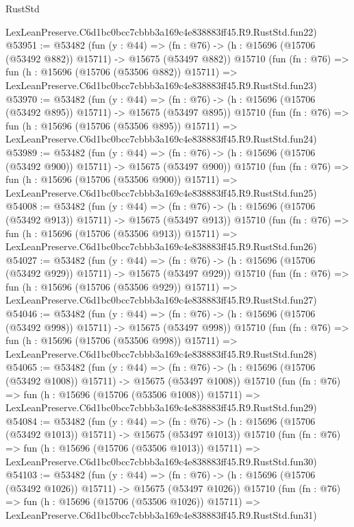 \begin{lexlean}{RustStd}
\begin{coremodule}
    LexLeanPreserve.C6d1bc0bcc7cbbb3a169c4e838883ff45.R9.RustStd.fun22)
@53951 := @53482
    (fun (y : @44) =>
    (fn : @76) -> (h : @15696 (@15706 (@53492 @882)) @15711) -> @15675 (@53497 @882))
    @15710
    (fun (fn : @76) =>
    fun (h : @15696 (@15706 (@53506 @882)) @15711) =>
    LexLeanPreserve.C6d1bc0bcc7cbbb3a169c4e838883ff45.R9.RustStd.fun23)
@53970 := @53482
    (fun (y : @44) =>
    (fn : @76) -> (h : @15696 (@15706 (@53492 @895)) @15711) -> @15675 (@53497 @895))
    @15710
    (fun (fn : @76) =>
    fun (h : @15696 (@15706 (@53506 @895)) @15711) =>
    LexLeanPreserve.C6d1bc0bcc7cbbb3a169c4e838883ff45.R9.RustStd.fun24)
@53989 := @53482
    (fun (y : @44) =>
    (fn : @76) -> (h : @15696 (@15706 (@53492 @900)) @15711) -> @15675 (@53497 @900))
    @15710
    (fun (fn : @76) =>
    fun (h : @15696 (@15706 (@53506 @900)) @15711) =>
    LexLeanPreserve.C6d1bc0bcc7cbbb3a169c4e838883ff45.R9.RustStd.fun25)
@54008 := @53482
    (fun (y : @44) =>
    (fn : @76) -> (h : @15696 (@15706 (@53492 @913)) @15711) -> @15675 (@53497 @913))
    @15710
    (fun (fn : @76) =>
    fun (h : @15696 (@15706 (@53506 @913)) @15711) =>
    LexLeanPreserve.C6d1bc0bcc7cbbb3a169c4e838883ff45.R9.RustStd.fun26)
@54027 := @53482
    (fun (y : @44) =>
    (fn : @76) -> (h : @15696 (@15706 (@53492 @929)) @15711) -> @15675 (@53497 @929))
    @15710
    (fun (fn : @76) =>
    fun (h : @15696 (@15706 (@53506 @929)) @15711) =>
    LexLeanPreserve.C6d1bc0bcc7cbbb3a169c4e838883ff45.R9.RustStd.fun27)
@54046 := @53482
    (fun (y : @44) =>
    (fn : @76) -> (h : @15696 (@15706 (@53492 @998)) @15711) -> @15675 (@53497 @998))
    @15710
    (fun (fn : @76) =>
    fun (h : @15696 (@15706 (@53506 @998)) @15711) =>
    LexLeanPreserve.C6d1bc0bcc7cbbb3a169c4e838883ff45.R9.RustStd.fun28)
@54065 := @53482
    (fun (y : @44) =>
    (fn : @76) -> (h : @15696 (@15706 (@53492 @1008)) @15711) -> @15675 (@53497 @1008))
    @15710
    (fun (fn : @76) =>
    fun (h : @15696 (@15706 (@53506 @1008)) @15711) =>
    LexLeanPreserve.C6d1bc0bcc7cbbb3a169c4e838883ff45.R9.RustStd.fun29)
@54084 := @53482
    (fun (y : @44) =>
    (fn : @76) -> (h : @15696 (@15706 (@53492 @1013)) @15711) -> @15675 (@53497 @1013))
    @15710
    (fun (fn : @76) =>
    fun (h : @15696 (@15706 (@53506 @1013)) @15711) =>
    LexLeanPreserve.C6d1bc0bcc7cbbb3a169c4e838883ff45.R9.RustStd.fun30)
@54103 := @53482
    (fun (y : @44) =>
    (fn : @76) -> (h : @15696 (@15706 (@53492 @1026)) @15711) -> @15675 (@53497 @1026))
    @15710
    (fun (fn : @76) =>
    fun (h : @15696 (@15706 (@53506 @1026)) @15711) =>
    LexLeanPreserve.C6d1bc0bcc7cbbb3a169c4e838883ff45.R9.RustStd.fun31)

\end{coremodule}
\end{lexlean}
